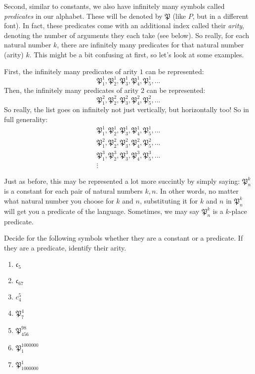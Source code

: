 Second, similar to constants, we also have infinitely many symbols called \textit{predicates} in our alphabet. These will be denoted by $\mathfrak{P}$ (like $P$, but in a different font). In fact, these predicates come with an additional index called their \textit{arity}, denoting the number of arguments they each take (see below). So really, for each natural number $k$, there are infinitely many predicates for that natural number (arity) $k$. This might be a bit confusing at first, so let's look at some examples. 

First, the infinitely many predicates of arity $1$ can be represented:
\[
\mathfrak{P}^1_1, \mathfrak{P}^1_2, \mathfrak{P}^1_3, \mathfrak{P}^1_4, \mathfrak{P}^1_5, ...
\]
Then, the infinitely many predicates of arity $2$ can be represented: 
\[
\mathfrak{P}^2_1, \mathfrak{P}^2_2, \mathfrak{P}^2_3, \mathfrak{P}^2_4, \mathfrak{P}^2_5, ...
\]
So really, the list goes on infinitely not just vertically, but horizontally too! So in full generality: 
\begin{gather*}
\mathfrak{P}^1_1, \mathfrak{P}^1_2, \mathfrak{P}^1_3, \mathfrak{P}^1_4, \mathfrak{P}^1_5, ...\\
\mathfrak{P}^2_1, \mathfrak{P}^2_2, \mathfrak{P}^2_3, \mathfrak{P}^2_4, \mathfrak{P}^2_5, ...\\
\mathfrak{P}^3_1, \mathfrak{P}^3_2, \mathfrak{P}^3_3, \mathfrak{P}^3_4, \mathfrak{P}^3_5, ...\\
\vdots
\end{gather*}

Just as before, this may be represented a lot more succintly by simply saying: $\mathfrak{P}^k_n$ is a constant for each pair of natural numbers $k, n$. In other words, no matter what natural number you choose for $k$ and $n$, substituting it for $k$ and $n$ in $\mathfrak{P}^k_n$ will get you a predicate of the language. Sometimes, we may say $\mathfrak{P}^k_n$ is a $k$-place predicate. 


\begin{exc}
Decide for the following symbols whether they are a constant or a predicate. If they are a predicate, identify their arity. 

\begin{enumerate}
	\item $\mathfrak{c}_5$
	\item $\mathfrak{c}_{67}$
	\item $c^5_4$
	\item $\mathfrak{P}^4_7$
	\item $\mathfrak{P}^{98}_{456}$
	\item $\mathfrak{P}^{1000000}_1$
	\item $\mathfrak{P}_{1000000}^1$
\end{enumerate}
\end{exc}

